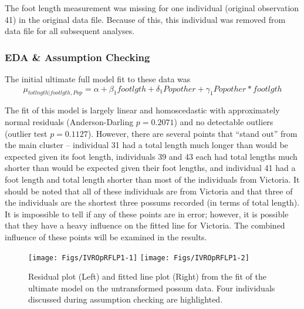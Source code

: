 \documentclass[10pt,openany]{book}\usepackage[]{graphicx}\usepackage[]{color}
\newenvironment{knitrout}{}{} %
\begin{document}
The foot length measurement was missing for one individual (original observation 41) in the original data file.  Because of this, this individual was removed from data file for all subsequent analyses.

\subsubsection*{EDA \& Assumption Checking}

The initial ultimate full model fit to these data was
\[ \mu_{totlngth|footlgth,Pop} = \alpha + \beta_{1}footlgth + \delta_{1}Popother + \gamma_{1}Popother*footlgth  \]

The fit of this model is largely linear and homoscedastic  with approximately normal residuals (Anderson-Darling $p=0.2071$) and no detectable outliers (outlier test $p=0.1127$).  However, there are several points that ``stand out'' from the main cluster  -- individual 31 had a total length much longer than would be expected given its foot length, individuals 39 and 43 each had total lengths much shorter than would be expected given their foot lengths, and individual 41 had a foot length and total length shorter than most of the individuals from Victoria.  It should be noted that all of these individuals are from Victoria and that three of the individuals are the shortest three possums recorded (in terms of total length).  It is impossible to tell if any of these points are in error; however, it is possible that they have a heavy influence on the fitted line for Victoria.  The combined influence of these points will be examined in the results.

\begin{knitrout}
\color{fgcolor}\begin{figure}[h]

{\centering \texttt{[image: Figs/IVROpRFLP1-1]} 
\texttt{[image: Figs/IVROpRFLP1-2]} 

}

\caption[Residual plot (Left) and fitted line plot (Right) from the fit of the ultimate model on the untransformed possum data]{Residual plot (Left) and fitted line plot (Right) from the fit of the ultimate model on the untransformed possum data.  Four individuals discussed during assumption checking are highlighted.}\label{fig:IVROpRFLP1}
\end{figure}


\end{knitrout}
\end{document}
